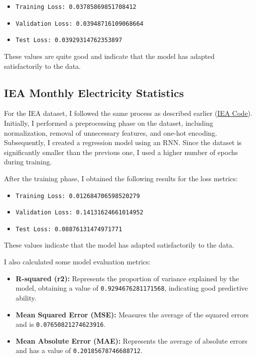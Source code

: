 \documentclass[12pt]{article}
\begin{document}
\begin{itemize}
  \item \texttt{Training Loss: 0.03785869851708412}
  \item \texttt{Validation Loss: 0.03948716109068664}
  \item \texttt{Test Loss: 0.03929314762353897}
\end{itemize}

These values are quite good and indicate that the model has adapted satisfactorily to the data.

\subsection{IEA Monthly Electricity Statistics}
For the IEA dataset, I followed the same process as described earlier (\href{https://www.kaggle.com/code/alessandromajumba/iea-model}{IEA Code}). Initially, I performed a preprocessing phase on the dataset, including normalization, removal of unnecessary features, and one-hot encoding. Subsequently, I created a regression model using an RNN. Since the dataset is significantly smaller than the previous one, I used a higher number of epochs during training.

After the training phase, I obtained the following results for the loss metrics:

\begin{itemize}
    \item \texttt{Training Loss: 0.012684706598520279}
    \item \texttt{Validation Loss: 0.14131624661014952}
    \item \texttt{Test Loss: 0.08876131474971771}
\end{itemize}

These values indicate that the model has adapted satisfactorily to the data.

I also calculated some model evaluation metrics:

\begin{itemize}
    \item \textbf{R-squared (r2):} Represents the proportion of variance explained by the model, obtaining a value of \texttt{0.9294676281171568}, indicating good predictive ability.
    \item \textbf{Mean Squared Error (MSE):} Measures the average of the squared errors and is \texttt{0.07650821274623916}.
    \item \textbf{Mean Absolute Error (MAE):} Represents the average of absolute errors and has a value of \texttt{0.20185678746688712}.
\end{itemize}
\end{document}
